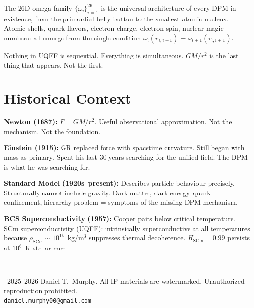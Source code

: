 \documentclass[12pt,a4paper]{article}
\begin{document}
The 26D omega family $\{\omega_i\}_{i=1}^{26}$ is the universal architecture of every
DPM in existence, from the primordial belly button to the smallest atomic nucleus.
Atomic shells, quark flavors, electron charge, electron spin, nuclear magic numbers:
all emerge from the single condition
$\omega_i(r_{i,i+1}) = \omega_{i+1}(r_{i,i+1})$.

Nothing in UQFF is sequential.  Everything is simultaneous.
$GM/r^2$ is the last thing that appears.  Not the first.

\appendix
\section{Historical Context}
\label{sec:history}

\noindent\textbf{Newton (1687):} $F = GM/r^2$.  Useful observational approximation.
Not the mechanism.  Not the foundation.

\noindent\textbf{Einstein (1915):} GR replaced force with spacetime curvature.
Still began with mass as primary.  Spent his last 30 years searching for the unified
field.  The DPM is what he was searching for.

\noindent\textbf{Standard Model (1920s--present):} Describes particle behaviour
precisely.  Structurally cannot include gravity.  Dark matter, dark energy, quark
confinement, hierarchy problem = symptoms of the missing DPM mechanism.

\noindent\textbf{BCS Superconductivity (1957):} Cooper pairs below critical
temperature.  SCm superconductivity (UQFF): intrinsically superconductive at all
temperatures because $\rho_{\text{SCm}} \sim 10^{15}$~kg/m$^3$ suppresses thermal
decoherence.  $H_{\text{SCm}} = 0.99$ persists at $10^6$~K stellar core.

\bigskip
\begin{center}
\rule{0.5\textwidth}{0.4pt}\\[6pt]
{\small \textcopyright~2025--2026 Daniel T.\ Murphy.
All IP materials are watermarked.  Unauthorized reproduction prohibited.}\\
{\small \texttt{daniel.murphy00@gmail.com}}
\end{center}
\end{document}
